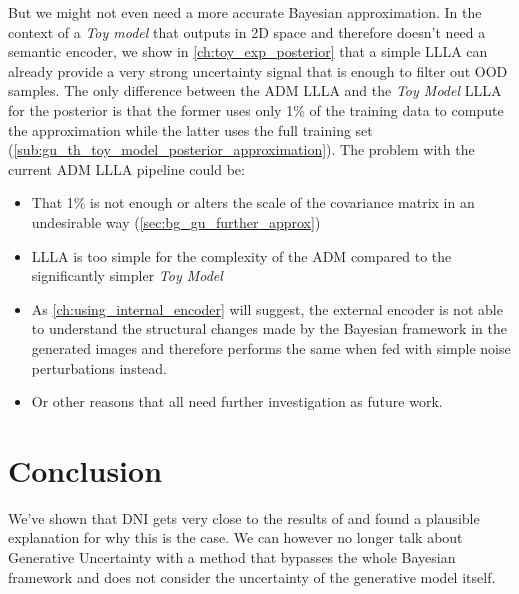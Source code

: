 But we might not even need a more accurate Bayesian approximation. In the context of a \emph{Toy model} that outputs in 2D space and therefore doesn't need a semantic encoder, we show in \autoref{ch:toy_exp_posterior} that a simple \acs{LLLA} can already provide a very strong uncertainty signal that is enough to filter out OOD samples. The only difference between the \acs{ADM} \acs{LLLA} and the \textit{Toy Model} \acs{LLLA} for the posterior is that the former uses only 1\% of the training data to compute the approximation while the latter uses the full training set (\autoref{sub:gu_th_toy_model_posterior_approximation}). The problem with the current \acs{ADM} \acs{LLLA} pipeline could be:
\begin{itemize}
    \item That 1\% is not enough or alters the scale of the covariance matrix in an undesirable way (\autoref{sec:bg_gu_further_approx})
    \item \acs{LLLA} is too simple for the complexity of the \acs{ADM} compared to the significantly simpler \textit{Toy Model}
    \item As \autoref{ch:using_internal_encoder} will suggest, the external encoder is not able to understand the structural changes made by the Bayesian framework in the generated images and therefore performs the same when fed with simple noise perturbations instead.
    \item Or other reasons that all need further investigation as future work.
\end{itemize}





\section{Conclusion}

We've shown that \acs{DNI} gets very close to the results of \cite{jazbec_generative_2025} and found a plausible explanation for why this is the case.
We can however no longer talk about Generative Uncertainty with a method that bypasses the whole Bayesian framework and does not consider the uncertainty of the generative model itself. 

